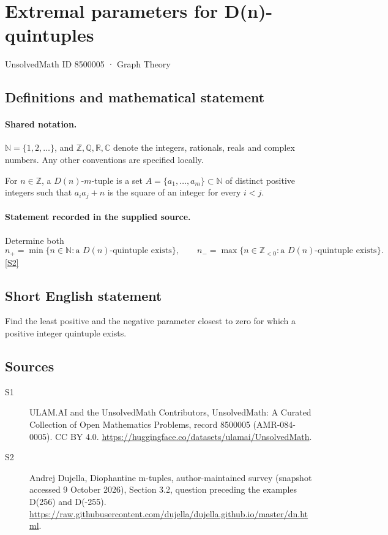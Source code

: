 \documentclass[11pt]{article}
\newcommand{\sref}[2]{\hyperlink{source:#1:#2}{[S#2]}}
\begin{document}
\setcounter{section}{8500004}
\section{Extremal parameters for D(n)-quintuples}\label{8500005}
{\small\sffamily UnsolvedMath ID 8500005 · Graph Theory}
\subsection{Definitions and mathematical statement}

\paragraph{Shared notation.}$\mathbb N=\{1,2,\ldots\}$, and $\mathbb Z,\mathbb Q,\mathbb R,\mathbb C$ denote the integers, rationals, reals and complex numbers. Any other conventions are specified locally.


For $n\in\mathbb Z$, a $D(n)$-$m$-tuple is a set $A=\{a_1,\ldots,a_m\}\subset\mathbb N$ of distinct positive integers such that $a_i a_j+n$ is the square of an integer for every $i<j$.
\paragraph{Statement recorded in the supplied source.}
Determine both \[ n_+=\min\{n\in\mathbb N:\text{a }D(n)\text{-quintuple exists}\},\qquad n_-=\max\{n\in\mathbb Z_{<0}:\text{a }D(n)\text{-quintuple exists}\}.\] \sref{8500005}{2}
\subsection{Short English statement}
Find the least positive and the negative parameter closest to zero for which a positive integer quintuple exists.
\subsection{Sources}
\begin{description}
\item[\hypertarget{source:8500005:1}{S1}] ULAM.AI and the UnsolvedMath Contributors, UnsolvedMath: A Curated Collection of Open Mathematics Problems, record 8500005 (AMR-084-0005). CC BY 4.0. \url{https://huggingface.co/datasets/ulamai/UnsolvedMath}.
\item[\hypertarget{source:8500005:2}{S2}] Andrej Dujella, Diophantine m-tuples, author-maintained survey (snapshot accessed 9 October 2026), Section 3.2, question preceding the examples D(256) and D(-255). \url{https://raw.githubusercontent.com/dujella/dujella.github.io/master/dn.html}.
\end{description}
\label{end:8500005}
\end{document}
